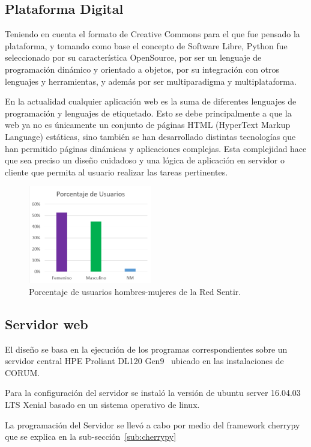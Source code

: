 \documentclass[journal,transmag]{IEEEtran}
\begin{document}
\subsection{Plataforma Digital}
Teniendo en cuenta el formato de Creative Commons para el que fue pensado la plataforma, y tomando como base el concepto de Software Libre, Python fue seleccionado por su característica OpenSource, por ser un lenguaje de programación dinámico y orientado a objetos, por su integración con otros lenguajes y herramientas, y además por ser multiparadigma y multiplataforma.

En la actualidad cualquier aplicación web es la suma de diferentes lenguajes de programación y lenguajes de etiquetado. Esto se debe principalmente a que la web ya no es únicamente un conjunto de páginas HTML (HyperText Markup Language) estáticas, sino también se han desarrollado distintas tecnologías que han permitido páginas dinámicas y aplicaciones complejas. Esta complejidad hace que sea preciso un diseño cuidadoso y una lógica de aplicación en servidor o cliente que permita al usuario realizar las tareas pertinentes. 

\begin{figure}[tbp]
\centering
\includegraphics[width=0.48\textwidth]{porcentaje.png}
\caption{Porcentaje de usuarios hombres-mujeres de la Red Sentir.}
\label{fig:porcentaje}
\end{figure}

\subsection{Servidor web}
El diseño se basa en la ejecución de los programas correspondientes sobre un servidor central HPE Proliant DL120 Gen9~\cite{Manual2018} ubicado en las instalaciones de CORUM.

Para la configuración del servidor se instaló la versión de ubuntu server 16.04.03 LTS Xenial basado en un sistema operativo de linux.

La programación del Servidor se llevó a cabo por medio del framework cherrypy que se explica en la sub-sección~\ref{sub:cherrypy}
\end{document}
